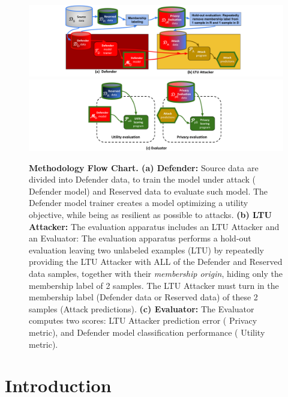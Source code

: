 \documentclass[letterpaper]{article}
\begin{document}
\begin{figure}[!h]
\begin{centering}
\includegraphics[width=\textwidth]{Figures/flowchart_part1.pdf} \\
\includegraphics[width=\textwidth]{Figures/flowchart_part2.pdf}
\caption{{\bf Methodology Flow Chart. (a) Defender:} Source data are divided into {\color{red} Defender data}, to train the model under attack ({\color{red} Defender model}) and {\color{blue} Reserved data} to evaluate such model. The {\color{red} Defender model trainer} creates a model optimizing a utility objective, while being as resilient as possible to attacks. {\bf (b) LTU Attacker:} The evaluation apparatus includes an {\color{orange} LTU Attacker} and an {\color{teal} Evaluator}: The evaluation apparatus performs a hold-out evaluation leaving two unlabeled examples (LTU) by repeatedly providing the {\color{orange} LTU Attacker} with ALL of the {\color{red} Defender} and {\color{blue} Reserved} data samples, together with their {\em membership origin}, hiding only the membership label of 2 samples. The {\color{orange} LTU Attacker} must turn in the membership label (Defender data or Reserved data) of these 2 samples (Attack predictions). {\bf (c) Evaluator:} The {\color{teal} Evaluator} computes two scores: {\color{orange} LTU Attacker} prediction error ({\color{teal} Privacy metric}), and {\color{red} Defender model} classification performance ({\color{teal} Utility metric}).}
\label{fig:teaser}
\end{centering}
\end{figure}



\section{Introduction}
\end{document}

